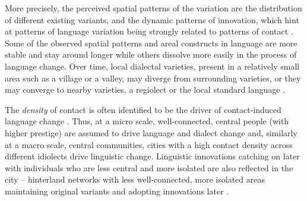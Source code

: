 \documentclass[output=paper]{langscibook}
\begin{document}
More precisely, the perceived spatial patterns of the variation are the distribution of different existing variants, and the dynamic patterns of innovation, which hint at patterns of language variation being strongly related to patterns of contact \parencite[cf.][]{Nerbonne2007,Lee2014}. Some of the observed spatial patterns and areal constructs in language are more stable and stay around longer while others dissolve more easily in the process of language change. Over time, local dialectal varieties, present in a relatively small area such as a village or a valley, may diverge from surrounding varieties, or they may converge to nearby varieties, a regiolect or the local standard language \parencite[cf.][]{Auer1996}.

The \textit{density} of contact is often identified to be the driver of contact-induced language change \parencite[cf.][414]{Bowern2013a}. Thus, at a micro scale, well-connected, central people (with higher prestige) are assumed to drive language and dialect change \parencite[e.g.,][]{Fagyal2010,Trudgill2014,Burridge2018} and, similarly at a macro scale, central communities, cities with a high contact density across different idiolects drive linguistic change. Linguistic innovations catching on later with individuals who are less central and more isolated are also reflected in the city – hinterland networks with less well-connected, more isolated areas maintaining original variants and adopting innovations later \parencite[e.g., Elfdalian in Sweden, cf.][]{Sapir.2005}.
\end{document}
